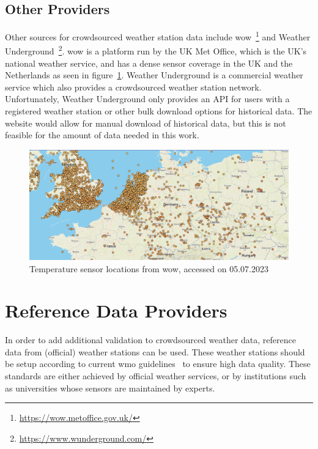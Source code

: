 \subsection{Other Providers}

Other sources for crowdsourced weather station data include \gls{wow}~\footnote{\url{https://wow.metoffice.gov.uk/}} and Weather Underground~\footnote{\url{https://www.wunderground.com/}}.
\gls{wow} is a platform run by the UK Met Office, which is the UK's national weather service, and has a dense sensor coverage in the UK and the Netherlands as seen in figure~\ref{fig:wow sensor locations}.
Weather Underground is a commercial weather service which also provides a crowdsourced weather station network. Unfortunately, Weather Underground only provides an API for users with a registered weather station or other bulk download options for historical data. The website would allow for manual download of historical data, but this is not feasible for the amount of data needed in this work.

\begin{figure}[ht]
    \centering
    \includegraphics[width=1\textwidth]{images/wow_sensor_locations.png}
    \caption{Temperature sensor locations from \gls{wow}, accessed on 05.07.2023}
    \label{fig:wow sensor locations}
\end{figure}

\section{Reference Data Providers}

In order to add additional validation to crowdsourced weather data, reference data from (official) weather stations can be used. These weather stations should be setup according to current \gls{wmo} guidelines~\cite{wmo2018guide} to ensure high data quality. These standards are either achieved by official weather services, or by institutions such as universities whose sensors are maintained by experts.

